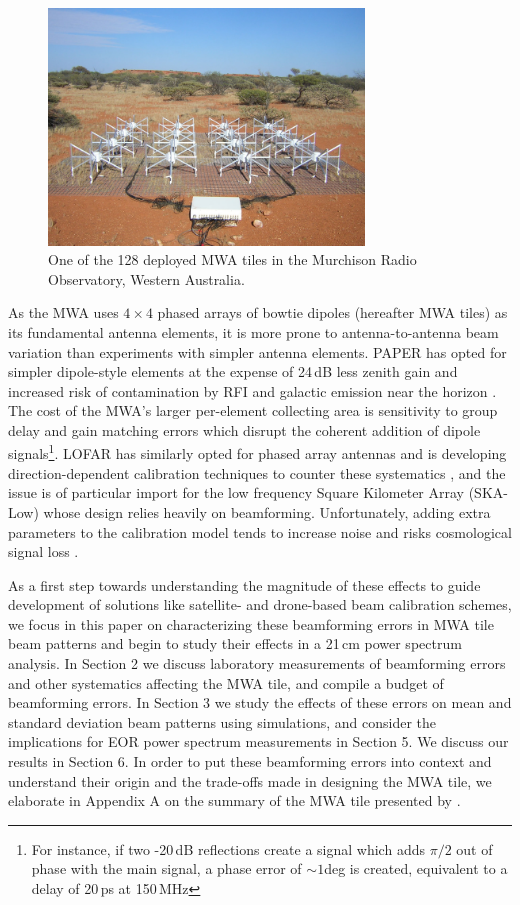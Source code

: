 \begin{figure}
\centering
\includegraphics[width=8.38cm]{chap2_beamforming_errors/tile_photo.pdf}
\caption[A deployed MWA tile in the Murchison Radio Observatory.]{One of the 128 deployed MWA tiles in the Murchison Radio Observatory, Western Australia.}
\label{fig:tilephoto}
\end{figure}

As the MWA uses $4\times4$ phased arrays of bowtie dipoles (hereafter MWA tiles) as its fundamental antenna elements, it is more prone to antenna-to-antenna beam variation than experiments with simpler antenna elements. PAPER has opted for simpler dipole-style elements at the expense of 24\,dB less zenith gain and increased risk of contamination by RFI and galactic emission near the horizon \citep{nithya15}. The cost of the MWA's larger per-element collecting area is sensitivity to group delay and gain matching errors which disrupt the coherent addition of dipole signals\footnote{For instance, if two -20\,dB reflections create a signal which adds $\pi/2$ out of phase with the main signal, a phase error of  $\sim1$deg is created, equivalent to a delay of 20\,ps at 150\,MHz}. LOFAR has similarly opted for phased array antennas and is developing direction-dependent calibration techniques to counter these systematics \citep{lofareorpaper}, and the issue is of particular import for the low frequency Square Kilometer Array (SKA-Low) \citep{ska1,ska2,ska3} whose design relies heavily on beamforming. Unfortunately, adding extra parameters to the calibration model tends to increase noise and risks cosmological signal loss \citep[e.g.,][]{gmrtsignalloss}.

As a first step towards understanding the magnitude of these effects to guide development of solutions like satellite- and drone-based beam calibration schemes, we focus in this paper on characterizing these beamforming errors in MWA tile beam patterns and begin to study their effects in a 21\,cm power spectrum analysis. In Section 2 we discuss laboratory measurements of beamforming errors and other systematics affecting the MWA tile, and compile a budget of beamforming errors. In Section 3 we study the effects of these errors on mean and standard deviation beam patterns using simulations, and consider the implications for EOR power spectrum measurements in Section 5. We discuss our results in Section 6. In order to put these beamforming errors into context and understand their origin and the trade-offs made in designing the MWA tile, we elaborate in Appendix A on the summary of the MWA tile presented by \citet{tingay13}.

